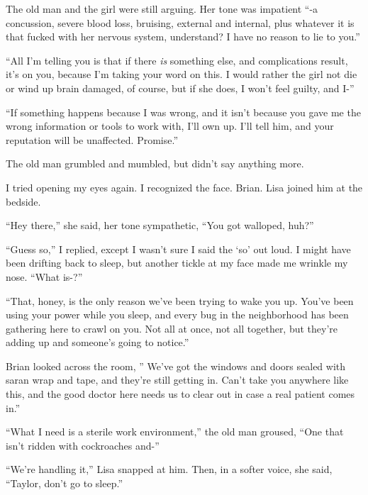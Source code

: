 The old man and the girl were still arguing.  Her tone was impatient ``-a concussion, severe blood loss, bruising, external and internal, plus whatever it is that fucked with her nervous system, understand?  I have no reason to lie to you.''



``All I'm telling you is that if there \emph{is} something else, and complications result, it's on you, because I'm taking your word on this.  I would rather the girl not die or wind up brain damaged, of course, but if she does, I won't feel guilty, and I-''



``If something happens because I was wrong, and it isn't because you gave me the wrong information or tools to work with, I'll own up.  I'll tell him, and your reputation will be unaffected.  Promise.''



The old man grumbled and mumbled, but didn't say anything more.



I tried opening my eyes again.  I recognized the face.  Brian.  Lisa joined him at the bedside.



``Hey there,'' she said, her tone sympathetic, ``You got walloped, huh?''



``Guess so,'' I replied, except I wasn't sure I said the `so' out loud.  I might have been drifting back to sleep, but another tickle at my face made me wrinkle my nose.  ``What is-?''



``That, honey, is the only reason we've been trying to wake you up.  You've been using your power while you sleep, and every bug in the neighborhood has been gathering here to crawl on you.  Not all at once, not all together, but they're adding up and someone's going to notice.''



Brian looked across the room, '' We've got the windows and doors sealed with saran wrap and tape, and they're still getting in.  Can't take you anywhere like this, and the good doctor here needs us to clear out in case a real patient comes in.''



``What I need is a sterile work environment,'' the old man groused, ``One that isn't ridden with cockroaches and-''



``We're handling it,'' Lisa snapped at him.  Then, in a softer voice, she said, ``Taylor, don't go to sleep.''



